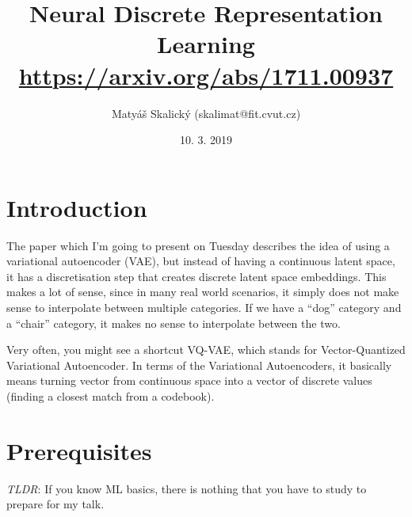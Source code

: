 \documentclass{article}
\title{Neural Discrete Representation Learning\cite{van2017neural} \\
	\Large \href{https://arxiv.org/abs/1711.00937}{https://arxiv.org/abs/1711.00937}}
\author{Matyáš Skalický (skalimat@fit.cvut.cz)}
\date{\vspace{-1em}10. 3. 2019}
\begin{document}
\maketitle

\section{Introduction}
The paper\cite{van2017neural} which I'm going to present on Tuesday describes the idea of using a variational autoencoder (VAE), but instead of having a continuous latent space, it has a discretisation step that creates discrete latent space embeddings. This makes a lot of sense, since in many real world scenarios, it simply does not make sense to interpolate between multiple categories. If we have a ``dog'' category and a ``chair'' category, it makes no sense to interpolate between the two.

Very often, you might see a shortcut VQ-VAE, which stands for Vector-Quantized Variational Autoencoder. In terms of the Variational Autoencoders, it basically means turning vector from continuous space into a vector of discrete values (finding a closest match from a codebook).

\section{Prerequisites}
\emph{TLDR}: If you know ML basics, there is nothing that you have to study to prepare for my talk.
\end{document}
